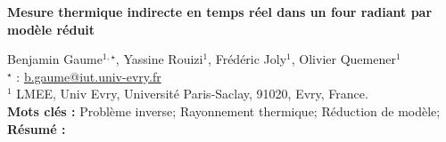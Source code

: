 


    \newpage


%
\begin{flushleft}
\addtocounter{section}{1}
{\Large \textbf{Mesure thermique indirecte en temps réel dans un four radiant par modèle réduit}}\label{ref:26}
\end{flushleft}
%
Benjamin Gaume$^{1,\star}$, Yassine Rouizi$^{1}$, Frédéric Joly$^{1}$, Olivier Quemener$^{1}$\\[2mm]
$^{\star}$ \Letter : \url{b.gaume@iut.univ-evry.fr}\\[2mm]
{\footnotesize $^{1}$ LMEE, Univ Evry, Université Paris-Saclay, 91020, Evry, France.}\\
[4mm]
%
\noindent \textbf{Mots clés : } Problème inverse; Rayonnement thermique; Réduction de modèle;\\[4mm]
%
\noindent \textbf{Résumé : } 

